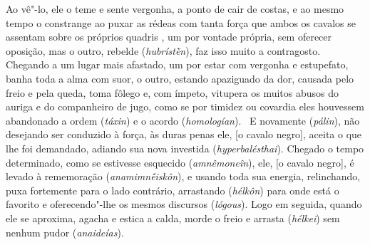 Ao vê"-lo, ele o teme e sente vergonha, a ponto de cair de costas, e ao
mesmo tempo o constrange ao puxar as rédeas com tanta força que ambos os
cavalos se assentam sobre os próprios quadris \bekker{[254c]}, um por vontade
própria, sem oferecer oposição, mas o outro, rebelde (\emph{hubrístḕn}),
faz isso muito a contragosto. Chegando a um lugar mais afastado, um por
estar com vergonha e estupefato, banha toda a alma com suor, o outro,
estando apaziguado da dor, causada pelo freio e pela queda, toma fôlego
e, com ímpeto, vitupera os muitos abusos do auriga e do companheiro de
jugo, como se por timidez ou covardia eles houvessem abandonado a ordem
(\emph{táxin}) e o acordo (\emph{homologían}).~\bekker{[254d]} E novamente
(\emph{pálin}), não desejando ser conduzido à força, às duras penas ele,
[o cavalo negro], aceita o que lhe foi demandado, adiando sua nova
investida (\emph{hyperbalésthai}). Chegado o tempo determinado, como se
estivesse esquecido (\emph{amnêmoneîn}), ele, [o cavalo negro], é
levado à rememoração (\emph{anamimnḗiskôn}), e usando toda sua energia,
relinchando, puxa fortemente para o lado contrário, arrastando
(\emph{hélkôn}) para onde está o favorito e oferecendo"-lhe os mesmos
discursos (\emph{lógous}). Logo em seguida, quando ele se aproxima,
agacha e estica a calda, morde o freio e arrasta (\emph{hélkei}) sem
nenhum pudor (\emph{anaideías}).

